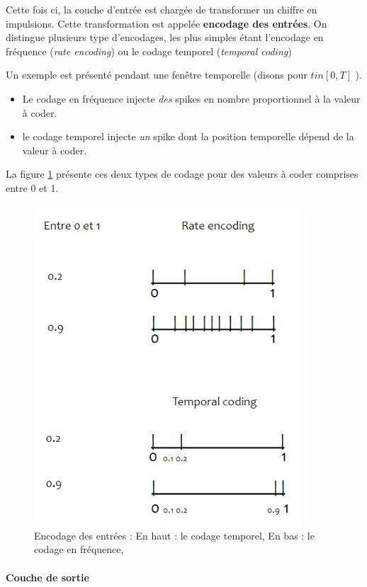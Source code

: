Cette fois ci, la couche d'entrée est chargée de transformer un chiffre
en impulsions. Cette transformation est appelée \textbf{encodage des
entrées}. On distingue plusieurs type d'encodages, les plus simples
étant l'encodage en fréquence (\emph{rate encoding}) ou le codage
temporel (\emph{temporal coding})

Un exemple est présenté pendant une fenêtre temporelle (disons pour
\(t in [0,T]\) ).

\begin{itemize}
\tightlist
\item
  Le codage en fréquence injecte \emph{des} spikes en nombre
  proportionnel à la valeur à coder.
\item
  le codage temporel injecte \emph{un} spike dont la position temporelle
  dépend de la valeur à coder.
\end{itemize}

La figure \ref{fig:encoding} présente ces deux types de codage pour des
valeurs à coder comprises entre 0 et 1.

\begin{figure}[h!]
\label{fig:encoding}
\centering
\includegraphics[width=10cm]{./images/ratetempcod.png}
\caption{Encodage des entrées : En haut : le codage temporel, En bas : le codage en fréquence, }
\end{figure}

\hypertarget{couche-de-sortie}{%
\paragraph{Couche de sortie}\label{couche-de-sortie}}

